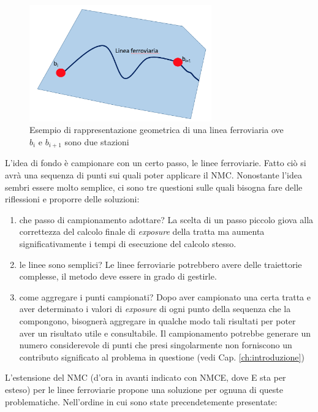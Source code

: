 \begin{figure}[bth]
  \centering
  \includegraphics[width=0.7\textwidth]{img/lineaFerroviaria}
  \caption{Esempio di rappresentazione geometrica di una linea ferroviaria ove $b_i$ e $b_{i+1}$ sono due stazioni } 
  \label{lineeFerroviarie}
\end{figure}
L'idea di fondo è campionare con un certo passo, le linee ferroviarie. Fatto ciò si avrà una sequenza di punti sui quali poter applicare il NMC. \newline
Nonostante l'idea sembri essere molto semplice, ci sono tre questioni sulle quali bisogna fare delle riflessioni e proporre delle soluzioni:
\begin{enumerate}
\item che passo di campionamento adottare? La scelta di un passo piccolo giova alla correttezza del calcolo finale di \textit{exposure} della tratta ma aumenta significativamente i tempi di esecuzione del calcolo stesso.
\item le linee sono semplici? Le linee ferroviarie potrebbero avere delle traiettorie complesse, il metodo deve essere in grado di gestirle.
\item come aggregare i punti campionati? Dopo aver campionato una certa tratta e aver determinato i valori di \textit{exposure} di ogni punto della sequenza che la compongono, bisognerà aggregare in qualche modo tali risultati per poter aver un risultato utile e consultabile.  
Il campionamento potrebbe generare un numero considerevole di punti che presi singolarmente non forniscono un contributo significato al problema in questione (vedi Cap. \ref{ch:introduzione})
\end{enumerate}
L'estensione del NMC (d'ora in avanti indicato con NMCE, dove E sta per esteso) per le linee ferroviarie propone una soluzione per ognuna di queste problematiche. Nell'ordine in cui sono state precendetemente presentate: 
